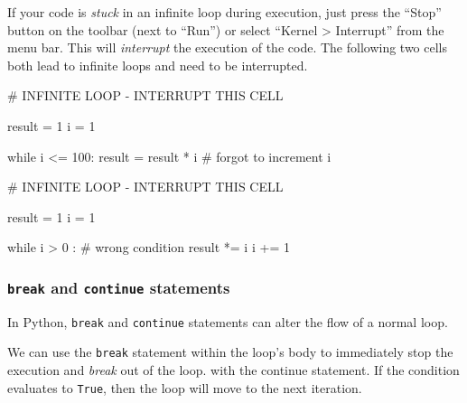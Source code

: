 \documentclass[
  letterpaper,
  DIV=11,
  numbers=noendperiod]{scrreprt}
\newenvironment{Shaded}{\begin{snugshade}}{\end{snugshade}}
\newcommand{\CommentTok}[1]{\textcolor[rgb]{0.37,0.37,0.37}{#1}}
\newcommand{\ControlFlowTok}[1]{\textcolor[rgb]{0.00,0.23,0.31}{#1}}
\newcommand{\DecValTok}[1]{\textcolor[rgb]{0.68,0.00,0.00}{#1}}
\newcommand{\NormalTok}[1]{\textcolor[rgb]{0.00,0.23,0.31}{#1}}
\newcommand{\OperatorTok}[1]{\textcolor[rgb]{0.37,0.37,0.37}{#1}}
\begin{document}
If your code is \emph{stuck} in an infinite loop during execution, just
press the ``Stop'' button on the toolbar (next to ``Run'') or select
``Kernel \textgreater{} Interrupt'' from the menu bar. This will
\emph{interrupt} the execution of the code. The following two cells both
lead to infinite loops and need to be interrupted.

\begin{Shaded}
\begin{Highlighting}[]
\CommentTok{\# INFINITE LOOP {-} INTERRUPT THIS CELL}

\NormalTok{result }\OperatorTok{=} \DecValTok{1}
\NormalTok{i }\OperatorTok{=} \DecValTok{1}

\ControlFlowTok{while}\NormalTok{ i }\OperatorTok{\textless{}=} \DecValTok{100}\NormalTok{:}
\NormalTok{    result }\OperatorTok{=}\NormalTok{ result }\OperatorTok{*}\NormalTok{ i}
    \CommentTok{\# forgot to increment i}
\end{Highlighting}
\end{Shaded}

\begin{Shaded}
\begin{Highlighting}[]
\CommentTok{\# INFINITE LOOP {-} INTERRUPT THIS CELL}

\NormalTok{result }\OperatorTok{=} \DecValTok{1}
\NormalTok{i }\OperatorTok{=} \DecValTok{1}

\ControlFlowTok{while}\NormalTok{ i }\OperatorTok{\textgreater{}} \DecValTok{0}\NormalTok{ : }\CommentTok{\# wrong condition}
\NormalTok{    result }\OperatorTok{*=}\NormalTok{ i}
\NormalTok{    i }\OperatorTok{+=} \DecValTok{1}
\end{Highlighting}
\end{Shaded}

\hypertarget{break-and-continue-statements}{%
\subsubsection{\texorpdfstring{\texttt{break} and \texttt{continue}
statements}{break and continue statements}}\label{break-and-continue-statements}}

In Python, \texttt{break} and \texttt{continue} statements can alter the
flow of a normal loop.

We can use the \texttt{break} statement within the loop's body to
immediately stop the execution and \emph{break} out of the loop. with
the continue statement. If the condition evaluates to \texttt{True},
then the loop will move to the next iteration.
\end{document}
